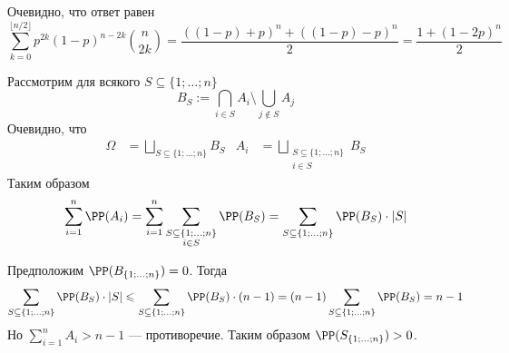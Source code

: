 \documentclass[12pt,a4paper]{article}
\begin{document}
    \begin{problem}{26}
        Очевидно, что ответ равен
        \[\sum_{k=0}^{\lfloor n/2 \rfloor} p^{2k} (1-p)^{n-2k} \binom{n}{2k} = \frac{((1-p) + p)^n + ((1-p) - p)^n}{2} = \frac{1 + (1-2p)^n}{2}\]
    \end{problem}

    \begin{problem}{30}
        Рассмотрим для всякого $S \subseteq \{1; \dots; n\}$
        \[B_S := \bigcap_{i \in S} A_i \setminus \bigcup_{j \notin S} A_j\]
        Очевидно, что
        \begin{align*}
            \Omega &= \bigsqcup_{S \subseteq \{1; \dots; n\}} B_S&
            A_i &= \bigsqcup_{\substack{S \subseteq \{1; \dots; n\}\\ i \in S}} B_S
        \end{align*}
        Таким образом
        \[
            \sum_{i=1}^n \PP(A_i)
            = \sum_{i=1}^n \sum_{\substack{S \subseteq \{1; \dots; n\}\\ i \in S}} \PP(B_S)
            = \sum_{S \subseteq \{1; \dots; n\}} \PP(B_S) \cdot |S|
        \]
        
        Предположим $\PP(B_{\{1; \dots; n\}}) = 0$. Тогда
        \[
            \sum_{S \subseteq \{1; \dots; n\}} \PP(B_S) \cdot |S|
            \leqslant \sum_{S \subseteq \{1; \dots; n\}} \PP(B_S) \cdot (n - 1)
            = (n - 1) \sum_{S \subseteq \{1; \dots; n\}} \PP(B_S)
            = n - 1
        \]
        Но $\sum_{i=1}^n A_i > n - 1$ --- противоречие. Таким образом $\PP(S_{\{1; \dots; n\}}) > 0$.
    \end{problem}
\end{document}
